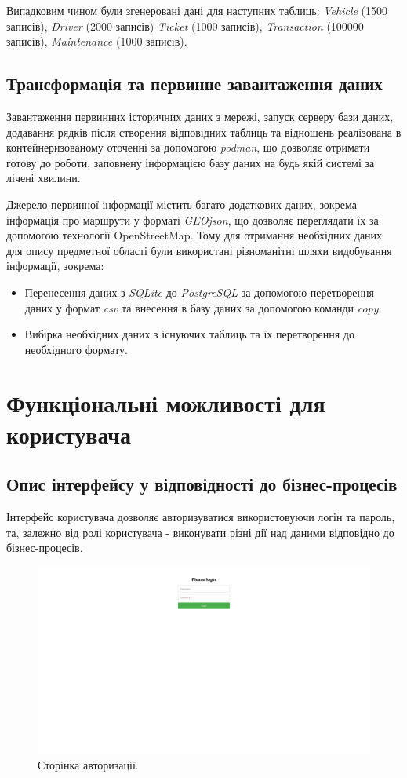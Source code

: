 \documentclass[oneside,14pt]{extarticle}
\begin{document}
Випадковим чином були згенеровані дані для наступних таблиць: \textit{Vehicle} (1500 записів), \textit{Driver} (2000 записів) \textit{Ticket} (1000 записів), \textit{Transaction} (100000 записів), \textit{Maintenance} (1000 записів).

\subsection{Трансформація та первинне завантаження даних}
Завантаження первинних історичних даних з мережі, запуск серверу бази даних, додавання рядків після створення відповідних таблиць та відношень реалізована в контейнеризованому оточенні за допомогою \textit{podman}, що дозволяє отримати готову до роботи, заповнену інформацією базу даних на будь якій системі за лічені хвилини.

Джерело первинної інформації містить багато додаткових даних, зокрема інформація про маршрути у форматі \textit{GEOjson}, що дозволяє переглядати їх за допомогою технології OpenStreetMap. Тому для отримання необхідних даних для опису предметної області були використані різноманітні шляхи видобування інформації, зокрема: 
\begin{itemize}
\item Перенесення даних з \textit{SQLite} до \textit{PostgreSQL} за допомогою перетворення даних у формат \textit{csv} та внесення в базу даних за допомогою команди \textit{copy}.
\item Вибірка необхідних даних з існуючих таблиць та їх перетворення до необхідного формату.
\end{itemize}

\newpage

\section{Функціональні можливості для користувача}
\subsection{Опис інтерфейсу у відповідності до бізнес-процесів}
Інтерфейс користувача дозволяє авторизуватися використовуючи логін та пароль, та, залежно від ролі користувача - виконувати різні дії над даними відповідно до бізнес-процесів.

\begin{figure}[H]
\centering
\includegraphics[scale=0.25]{1}
\caption{Сторінка авторизації.}
\end{figure}
\end{document}
